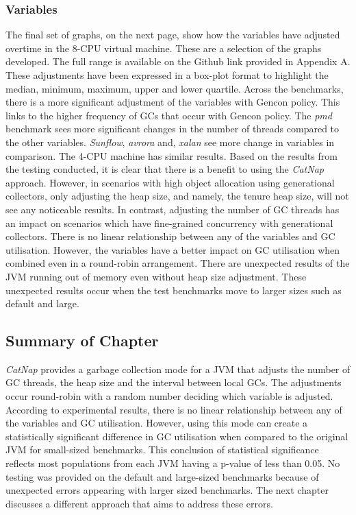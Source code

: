 \subsubsection{Variables}
The final set of graphs, on the next page, show how the variables have
adjusted overtime in the 8-CPU virtual machine. These are a selection
of the graphs developed. The full range is available on the Github link
provided in Appendix A. These adjustments have been expressed in a box-plot format to
highlight the median, minimum, maximum, upper and lower quartile. Across
the benchmarks, there is a more significant adjustment of the variables
with Gencon policy. This links to the higher frequency of GCs that
occur with Gencon policy. The \emph{pmd} benchmark sees more significant
changes in the number of threads compared to the other variables.
\emph{Sunflow}, \emph{avrora} and, \emph{xalan} see more change in variables in comparison.
The 4-CPU machine has similar results. Based on
the results from the testing conducted, it is clear that there is a
benefit to using the \emph{CatNap} approach. However, in scenarios with high
object allocation using generational collectors, only adjusting the heap
size, and namely, the tenure heap size, will not see any noticeable
results.
\newline\newline
In contrast, adjusting the number of GC threads has an impact on
scenarios which have fine-grained concurrency with generational
collectors. There is no linear relationship between any of the variables
and GC utilisation. However, the variables have a better impact on GC
utilisation when combined even in a round-robin arrangement. There are
unexpected results of the JVM running out of memory even without heap
size adjustment. These unexpected results occur when the test benchmarks
move to larger sizes such as default and large.
\subsection{Summary of Chapter}
\emph{CatNap} provides a garbage collection mode for a JVM that adjusts the
number of GC threads, the heap size and the interval between local GCs.
The adjustments occur round-robin with a random number deciding which
variable is adjusted. According to experimental results, there is no
linear relationship between any of the variables and GC utilisation.
However, using this mode can create a statistically significant
difference in GC utilisation when compared to the original JVM for
small-sized benchmarks. This conclusion of statistical significance
reflects most populations from each JVM having a p-value of less than
0.05. No testing was provided on the default and large-sized benchmarks
because of unexpected errors appearing with larger sized benchmarks. The next chapter
discusses a different approach that aims to address these errors.
